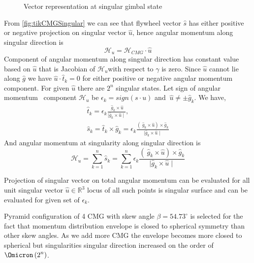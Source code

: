 \begin{figure}[!h]
    \centering
    
    \caption{Vector representation at singular gimbal state}
    \label{fig:tikCMGSingular}
\end{figure}

From \autoref{fig:tikCMGSingular} we can see that flywheel vector $\displaystyle \hat{s}$ has either positive or negative projection on singular vector $\displaystyle \hat{u}$, hence angular momentum along singular direction is
\begin{equation*}
\mathcal{H}_{u} =\mathcal{H}_{CMG} \cdotp \hat{u}
\end{equation*}
Component of angular momentum along singular direction has constant value based on $\displaystyle \hat{u}$ that is Jacobian of $\displaystyle \mathcal{H}_{u}$with respect to $\displaystyle \gamma $ is zero. Since $\displaystyle \hat{u}$ cannot lie along $\displaystyle \hat{g}$ we have $\displaystyle \hat{u} \cdotp \hat{t}_{k} =0$ for either positive or negative angular momentum component. For given $\displaystyle \hat{u}$ there are $\displaystyle 2^{n}$ singular states. Let sign of angular momentum \ component $\displaystyle \mathcal{H}_{u}$ be $\displaystyle \epsilon _{k} =sign( s\cdotp u)$ and $\displaystyle \ \hat{u} \neq \pm \hat{g}_{k}$. We have,
\begin{gather}
\hat{t}_{k} =\epsilon _{k}\frac{\ \hat{g}_{k} \times \hat{u}}{\mid \hat{g}_{k} \times \hat{u} \mid } ,\\
\hat{s}_{k} =\hat{t}_{k} \times \hat{g}_{k} =\epsilon _{k}\frac{( \ \hat{g}_{k} \times \hat{u}) \times \hat{g}_{k}}{\mid \hat{g}_{k} \times \hat{u} \mid }
\end{gather}
And angular momentum at singularity along singular direction is 
\begin{equation}
\mathcal{H}_{u} =\sum ^{n}_{k=1}\hat{s}_{k} =\sum ^{n}_{k=1} \epsilon _{k}\frac{( \ \hat{g}_{k} \times \hat{u}) \times \hat{g}_{k}}{\mid \hat{g}_{k} \times \hat{u} \mid }
\end{equation}


Projection of singular vector on total angular momentum can be evaluated for all unit singular vector $\displaystyle \hat{u} \in \mathbb{R}^{3}$ locus of all such points is singular surface and can be evaluated for given set of $\epsilon_k$. \cite{YoonSingularity}

Pyramid configuration of 4 CMG with skew angle $\beta =54.73^{\circ }$ is selected for the fact that momentum distribution envelope is closed to spherical symmetry than other skew angles.\cite{ABaker2020} As we add more CMG the envelope becomes more closed to spherical but singularities singular direction increased on the order of $\displaystyle \Omicron \left( 2^{n}\right)$.

